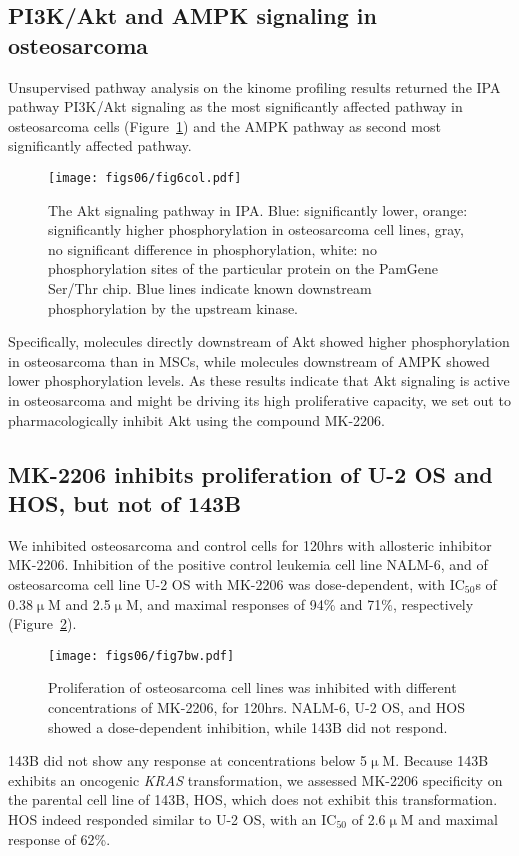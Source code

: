 \subsection{PI3K/Akt and AMPK signaling in osteosarcoma}
Unsupervised pathway analysis on the kinome profiling results returned the IPA pathway PI3K/Akt signaling as the most significantly affected pathway in osteosarcoma cells (Figure~\ref{fig6.6}) and the AMPK pathway as second most significantly affected pathway.
%
\begin{figure}[htbp]
	\centering
	\texttt{[image: figs06/fig6col.pdf]}	%
	\caption{The Akt signaling pathway in IPA. Blue: significantly lower, orange: significantly higher phosphorylation in osteosarcoma cell lines, gray, no significant difference in phosphorylation, white: no phosphorylation sites of the particular protein on the PamGene Ser/Thr chip. Blue lines indicate known downstream phosphorylation by the upstream kinase.}
	\label{fig6.6}
\end{figure}
%
Specifically, molecules directly downstream of Akt showed higher phosphorylation in osteosarcoma than in MSCs, while molecules downstream of AMPK showed lower phosphorylation levels. As these results indicate that Akt signaling is active in osteosarcoma and might be driving its high proliferative capacity, we set out to pharmacologically inhibit Akt using the compound MK-2206.

\subsection{MK-2206 inhibits proliferation of U-2 OS and HOS, but not of 143B}
We inhibited osteosarcoma and control cells for 120hrs with allosteric inhibitor MK-2206. Inhibition of the positive control leukemia cell line NALM-6, and of osteosarcoma cell line U-2 OS with MK-2206 was dose\hyp{}dependent, with IC$_{50}$s of 0.38$\upmu$M and 2.5$\upmu$M, and maximal responses of 94\% and 71\%, respectively (Figure~\ref{fig6.7}).
%
\begin{figure}[htbp]
	\centering
	\texttt{[image: figs06/fig7bw.pdf]}	%
	\caption{Proliferation of osteosarcoma cell lines was inhibited with different concentrations of MK-2206, for 120hrs. NALM-6, U-2 OS, and HOS showed a dose\hyp{}dependent inhibition, while 143B did not respond.}
	\label{fig6.7}
\end{figure}
%
143B did not show any response at concentrations below 5$\upmu$M. Because 143B exhibits an oncogenic {\it KRAS} transformation, we assessed MK-2206 specificity on the parental cell line of 143B, HOS, which does not exhibit this transformation. HOS indeed responded similar to U-2 OS, with an IC$_{50}$ of 2.6$\upmu$M and maximal response of 62\%.

